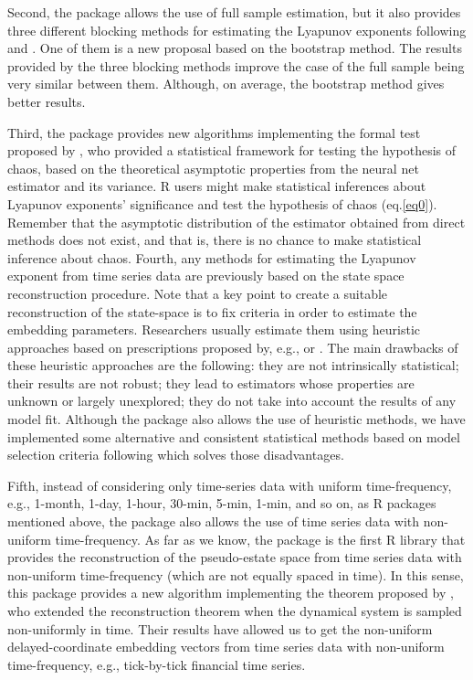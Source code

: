 Second, the  package allows the use of full sample estimation, but it also provides three different blocking methods for estimating the Lyapunov exponents following \cite{McCaffrey1992} and \cite{Shintani2004}. One of them is a new proposal based on the bootstrap method. The results provided by the three blocking methods improve the case of the full sample being very similar between them. Although, on average, the bootstrap method gives better results.

Third, the  package provides new algorithms implementing the formal test proposed by \cite{Shintani2004}, who provided a statistical framework for testing the hypothesis of chaos, based on the theoretical asymptotic properties from the neural net estimator and its variance. R users might make statistical inferences about Lyapunov exponents' significance and test the hypothesis of chaos (eq.\ref{eq0}). Remember that the asymptotic distribution of the estimator obtained from direct methods does not exist, and that is, there is no chance to make statistical inference about chaos. 
\newpage
Fourth, any methods for estimating the Lyapunov exponent from time series data are previously based on the state space reconstruction procedure. Note that a key point to create a suitable reconstruction of the state-space is to fix criteria in order to estimate the embedding parameters. Researchers usually estimate them using heuristic approaches based on prescriptions proposed by, e.g., \cite{Abarbanel1996} or \cite{Kantz2004}. The main drawbacks of these heuristic approaches are the following: they are not intrinsically statistical; their results are not robust; they lead to estimators whose properties are unknown or largely unexplored; they do not take into account the results of any model fit. Although the  package also allows the use of heuristic methods, we have implemented some alternative and consistent statistical methods based on model selection criteria following \cite{Tong2001} which solves those disadvantages.

Fifth, instead of considering only time-series data with uniform time-frequency, e.g., 1-month, 1-day, 1-hour, 30-min, 5-min, 1-min, and so on, as R packages mentioned above, the  package also allows the use of time series data with non-uniform time-frequency. As far as we know, the  package is the first R library that provides the reconstruction of the pseudo-estate space from time series data with non-uniform time-frequency (which are not equally spaced in time). In this sense, this package provides a new algorithm implementing the theorem proposed by \cite{Huke2007}, who extended the reconstruction theorem when the dynamical system is sampled non-uniformly in time. Their results have allowed us to get the non-uniform delayed-coordinate embedding vectors from time series data with non-uniform time-frequency, e.g., tick-by-tick financial time series. 


